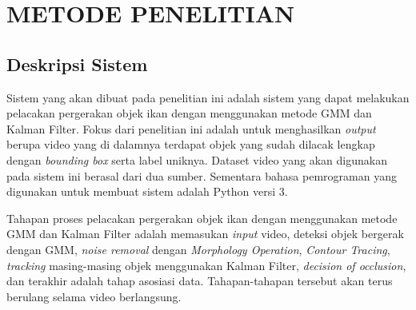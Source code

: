 
\chapter{METODE PENELITIAN}

\section{Deskripsi Sistem}
    Sistem yang akan dibuat pada penelitian ini adalah sistem yang dapat melakukan pelacakan pergerakan objek ikan dengan menggunakan metode GMM dan Kalman Filter. Fokus dari penelitian ini adalah untuk menghasilkan \textit{output} berupa video yang di dalamnya terdapat objek yang sudah dilacak lengkap dengan \textit{bounding box} serta label uniknya. Dataset video yang akan digunakan pada sistem ini berasal dari dua sumber. Sementara bahasa pemrograman yang digunakan untuk membuat sistem adalah Python versi 3. 
    
    Tahapan proses pelacakan pergerakan objek ikan dengan menggunakan metode GMM dan Kalman Filter adalah memasukan \textit{input} video, deteksi objek bergerak dengan GMM, \textit{noise removal} dengan \textit{Morphology Operation}, \textit{Contour Tracing}, \textit{tracking} masing-masing objek menggunakan Kalman Filter, \textit{decision of occlusion}, dan terakhir adalah tahap asosiasi data. Tahapan-tahapan tersebut akan terus berulang selama video berlangsung.
    
